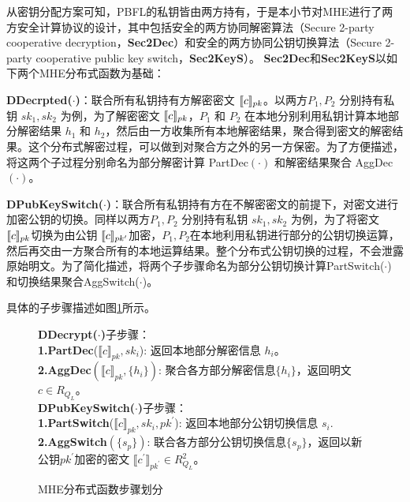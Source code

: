 从密钥分配方案可知，PBFL的私钥皆由两方持有，于是本小节对MHE进行了两方安全计算协议的设计，其中包括安全的两方协同解密算法（Secure 2-party cooperative decryption，\textbf{Sec2Dec}）和安全的两方协同公钥切换算法（Secure 2-party cooperative public key switch，\textbf{Sec2KeyS}）。
\textbf{Sec2Dec}和\textbf{Sec2KeyS}以如下两个MHE分布式函数为基础：
\begin{compactitem}
	\item \textbf{DDecrpted($\cdot$)}：联合所有私钥持有方解密密文 $\ctx[pk]{c}$。以两方$P_1, P_2$ 分别持有私钥 $sk_1, sk_2$ 为例，为了解密密文 $\ctx[pk]{c}$，$P_1$ 和 $P_2$ 在本地分别利用私钥计算本地部分解密结果 $ h_1 $ 和 $ h_2 $，然后由一方收集所有本地解密结果，聚合得到密文的解密结果。这个分布式解密过程，可以做到对聚合方之外的另一方保密。为了方便描述，将这两个子过程分别命名为部分解密计算 PartDec$(\cdot)$ 和解密结果聚合 AggDec$(\cdot)$。
	\item  \textbf{DPubKeySwitch($ \cdot $)}：联合所有私钥持有方在不解密密文的前提下，对密文进行加密公钥的切换。同样以两方$P_1, P_2$ 分别持有私钥 $sk_1, sk_2$ 为例，为了将密文$ \ctx[pk]{c} $切换为由公钥 $ \ctx[pk^{\prime}]{c} $加密，$ P_1,P_2 $在本地利用私钥进行部分的公钥切换运算，然后再交由一方聚合所有的本地运算结果。整个分布式公钥切换的过程，不会泄露原始明文。为了简化描述，将两个子步骤命名为部分公钥切换计算PartSwitch($\cdot$) 和切换结果聚合AggSwitch($\cdot$)。
\end{compactitem}

具体的子步骤描述如图\ref{f2}所示。
\begin{figure}
	\begin{framed}
		{\wuhao
		\textbf{DDecrypt($\cdot$)}子步骤：\\
		\indent\textbf{1.PartDec}($\llbracket c\rrbracket_{pk},sk_i$): 返回本地部分解密信息 $h_i$。\\
		\indent\textbf{2.AggDec}$(\llbracket c\rrbracket_{pk},\{h_i\})$: 聚合各方部分解密信息$\{h_i\}$，返回明文 $c\in R_{Q_{L}}$。\\
		
		\textbf{DPubKeySwitch($ \cdot $)}子步骤：\\
		\indent\textbf{1.PartSwitch}($\llbracket c\rrbracket_{pk},{sk_i},pk^{\prime}$): 返回本地部分公钥切换信息 $s_i$.\\
		\indent\textbf{2.AggSwitch}$(\{s_p\})$: 联合各方部分公钥切换信息$\{s_p\}$，返回以新公钥$ pk^{\prime} $加密的密文 $\llbracket c^{\prime}\rrbracket_{pk^{\prime}} \in R^2_{Q_{L}}$。}
	\end{framed}
	\caption{MHE分布式函数步骤划分}
	\label{f2}
\end{figure}

